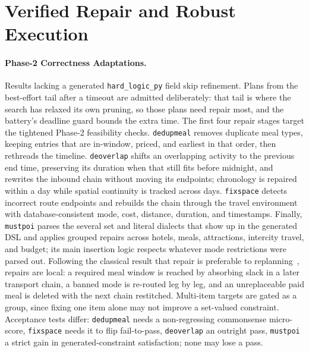 \documentclass{article}
\begin{document}
\section{Verified Repair and Robust Execution}
 
\paragraph{Phase-2 Correctness Adaptations.}
Results lacking a generated \texttt{hard\_logic\_py} field skip refinement.
Plans from the best-effort tail after a timeout are admitted deliberately:
that tail is where the search has relaxed its own pruning, so those plans
need repair most, and the battery's deadline guard bounds the extra time.
The first four repair stages target the tightened Phase-2 feasibility
checks. \texttt{dedupmeal} removes duplicate meal types, keeping entries
that are in-window, priced, and earliest in that order, then rethreads the
timeline. \texttt{deoverlap} shifts an overlapping activity to the previous
end time, preserving its duration when that still fits before midnight, and
rewrites the inbound chain without moving its endpoints; chronology is
repaired within a day while spatial continuity is tracked across days.
\texttt{fixspace} detects incorrect route endpoints and rebuilds the chain
through the travel environment with database-consistent mode, cost,
distance, duration, and timestamps. Finally, \texttt{mustpoi} parses the several set and literal
dialects that show up in the generated DSL and applies grouped repairs
across hotels, meals, attractions, intercity travel, and budget; its main
insertion logic respects whatever mode restrictions were parsed out.
Following the classical result that repair is preferable to
replanning~\cite{planrepair}, repairs are local: a required meal window is
reached by absorbing slack in a later transport chain, a banned mode is
re-routed leg by leg, and an unreplaceable paid meal is deleted with the
next chain restitched.
Multi-item targets are gated as a group, since fixing one item alone may
not improve a set-valued constraint. Acceptance tests differ: \texttt{dedupmeal} needs a non-regressing
commonsense micro-score, \texttt{fixspace} needs it to flip fail-to-pass,
\texttt{deoverlap} an outright pass, \texttt{mustpoi} a strict gain in
generated-constraint satisfaction; none may lose a pass.
 
\end{document}
